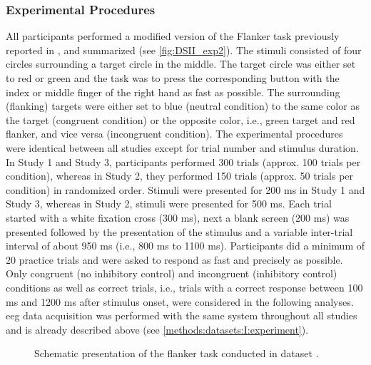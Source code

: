 \subsubsection{Experimental Procedures}
\label{methods:datasets:II:experiment}
All participants performed a modified version of the Flanker task previously reported in \cite{Reuter2017, Winneke2012, Winneke2019}, and summarized \cite{Reuter2019} (see \autoref{fig:DSII_exp2}). The stimuli consisted of four circles surrounding a target circle in the middle. The target circle was either set to red or green and the task was to press the corresponding button with the index or middle finger of the right hand as fast as possible. The surrounding (flanking) targets were either set to blue (neutral condition) to the same color as the target (congruent condition) or the opposite color, i.e., green target and red flanker, and vice versa (incongruent condition). The experimental procedures were identical between all studies except for trial number and stimulus duration. In Study 1 and Study 3, participants performed 300 trials (approx. 100 trials per condition), whereas in Study 2, they performed 150 trials (approx. 50 trials per condition) in randomized order. Stimuli were presented for 200 ms in Study 1 and Study 3, whereas in Study 2, stimuli were presented for 500 ms. Each trial started with a white fixation cross (300 ms), next a blank screen (200 ms) was presented followed by the presentation of the stimulus and a variable inter-trial interval of about 950 ms (i.e., 800 ms to 1100 ms). Participants did a minimum of 20 practice trials and were asked to respond as fast and precisely as possible. Only congruent (no inhibitory control) and incongruent (inhibitory control) conditions as well as correct trials, i.e., trials with a correct response between 100 ms and 1200 ms after stimulus onset, were considered in the following analyses.\\
\Gls{eeg} data acquisition was performed with the same system throughout all studies and is already described above (see \autoref{methods:datasets:I:experiment}). 

\begin{figure}[h]
\begin{center}

\caption[Schematic presentation of the flanker task conducted in dataset .]{Schematic presentation of the flanker task conducted in dataset .}
\label{fig:DSII_exp2}
\end{center}
\end{figure}

